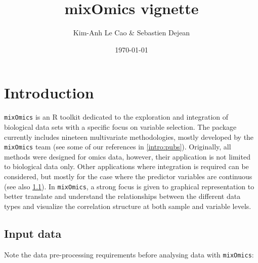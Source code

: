 \documentclass[]{book}
\title{mixOmics vignette}
\author{Kim-Anh Le Cao \& Sebastien Dejean}
\date{\today}
\theoremstyle{definition}
\theoremstyle{definition}
\theoremstyle{definition}
\theoremstyle{remark}
\begin{document}
\maketitle

{
\setcounter{tocdepth}{1}
\tableofcontents
}
\chapter{Introduction}\label{intro}

\texttt{mixOmics} is an R toolkit dedicated to the exploration and
integration of biological data sets with a specific focus on variable
selection. The package currently includes nineteen multivariate
methodologies, mostly developed by the \texttt{mixOmics} team (see some
of our references in \ref{intro:pubs}). Originally, all methods were
designed for omics data, however, their application is not limited to
biological data only. Other applications where integration is required
can be considered, but mostly for the case where the predictor variables
are continuous (see also \ref{intro:datatypes}). In \texttt{mixOmics}, a
strong focus is given to graphical representation to better translate
and understand the relationships between the different data types and
visualize the correlation structure at both sample and variable levels.

\section{Input data}\label{intro:datatypes}

Note the data pre-processing requirements before analysing data with
\texttt{mixOmics}:
\end{document}
